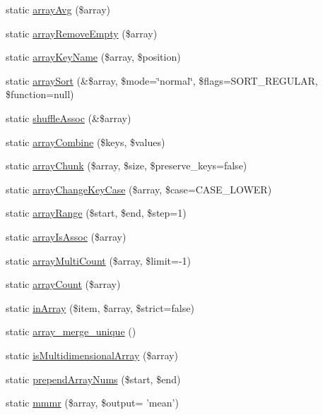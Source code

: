 \begin{DoxyCompactItemize}
\item 
static \hyperlink{class_arrays_a09cc872f0518a733306ff64254647366}{array\-Avg} (\$array)
\item 
static \hyperlink{class_arrays_a295b5b54a68f299f4bfbe38a552b8bf7}{array\-Remove\-Empty} (\$array)
\item 
static \hyperlink{class_arrays_af42ad58d02261841af1d538b8bb2434e}{array\-Key\-Name} (\$array, \$position)
\item 
static \hyperlink{class_arrays_a76dc5bd399c7a56de7b2f433d0172d1c}{array\-Sort} (\&\$array, \$mode=\char`\"{}normal\char`\"{}, \$flags=S\-O\-R\-T\-\_\-\-R\-E\-G\-U\-L\-A\-R, \$function=null)
\item 
static \hyperlink{class_arrays_a5acf330029fd060f7205ce1283865974}{shuffle\-Assoc} (\&\$array)
\item 
static \hyperlink{class_arrays_a1c45e7b3a80b382e1a6bbc4763f7601e}{array\-Combine} (\$keys, \$values)
\item 
static \hyperlink{class_arrays_a71d2f26fa90801bce850e767aefeefab}{array\-Chunk} (\$array, \$size, \$preserve\-\_\-keys=false)
\item 
static \hyperlink{class_arrays_a728a493c01d43b3ad74e0762e823e482}{array\-Change\-Key\-Case} (\$array, \$case=C\-A\-S\-E\-\_\-\-L\-O\-W\-E\-R)
\item 
static \hyperlink{class_arrays_a22639038bc3346acfac6a0571346c785}{array\-Range} (\$start, \$end, \$step=1)
\item 
static \hyperlink{class_arrays_a891afd254cc8dcf7db4e78cd34fff7d6}{array\-Is\-Assoc} (\$array)
\item 
static \hyperlink{class_arrays_aa2e849c9af7981ca56bb8f6fa2f341ea}{array\-Multi\-Count} (\$array, \$limit=-\/1)
\item 
static \hyperlink{class_arrays_aedcf385353cb69e5ece0619833633424}{array\-Count} (\$array)
\item 
static \hyperlink{class_arrays_a66abde21c4b988bc3ce9a672022e11cc}{in\-Array} (\$item, \$array, \$strict=false)
\item 
static \hyperlink{class_arrays_ae95a52e514bc8df44448fdfcc8c13b30}{array\-\_\-merge\-\_\-unique} ()
\item 
static \hyperlink{class_arrays_a2ba413c9a1d63df899435a1e00bdbe6a}{is\-Multidimensional\-Array} (\$array)
\item 
static \hyperlink{class_arrays_af4a063aa25a246f7768368900d61656a}{prepend\-Array\-Nums} (\$start, \$end)
\item 
static \hyperlink{class_arrays_a3122159e618851202d3b8596f31e2166}{mmmr} (\$array, \$output= 'mean')

\end{DoxyCompactItemize}
